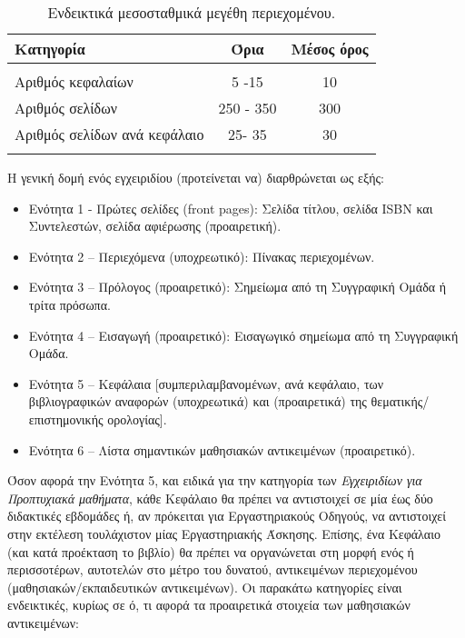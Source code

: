 \begin{table} [h] \centering
\caption{Ενδεικτικά μεσοσταθμικά μεγέθη περιεχομένου.}
\vspace{2mm}
\begin{tabular} {l c c}
\hline
	\textbf{Κατηγορία}	&\textbf{Όρια}	&\textbf{Μέσος όρος}\\
\hline
		&	    &	\\
Αριθμός κεφαλαίων	&5 -15 	&10\\
Αριθμός σελίδων	&250 - 350	    &300	\\
Αριθμός σελίδων ανά κεφάλαιο	&25- 35	    &30	\\
	&	    &	\\
\hline
\end{tabular}
\label{table:megethi}
\end{table}

Η γενική δομή ενός εγχειριδίου (προτείνεται να) διαρθρώνεται ως εξής:
\begin{itemize}
\item Ενότητα  1  - Πρώτες  σελίδες  (front pages): Σελίδα  τίτλου,  σελίδα  ISBN  και
Συντελεστών, σελίδα αφιέρωσης (προαιρετική).
\item Ενότητα 2 – Περιεχόμενα (υποχρεωτικό): Πίνακας περιεχομένων.
\item  Ενότητα 3 – Πρόλογος (προαιρετικό): Σημείωμα από τη Συγγραφική Ομάδα ή τρίτα
πρόσωπα.
\item Ενότητα 4 –  Εισαγωγή (προαιρετικό):  Εισαγωγικό σημείωμα από τη Συγγραφική
Ομάδα.
\item  Ενότητα 5 – Κεφάλαια [συμπεριλαμβανομένων, ανά κεφάλαιο, των βιβλιογραφικών
αναφορών (υπο\-χρε\-ω\-τι\-κά) και (προαιρετικά) της θεματικής/επιστημονικής ορολογίας].
\item  Ενότητα 6 – Λίστα σημαντικών μαθησιακών αντικειμένων (προαιρετικό).
\end{itemize}

Όσον αφορά την Ενότητα 5, και ειδικά για την κατηγορία των \emph{Εγχειριδίων για Προπτυχιακά
μαθήματα}, κάθε Κεφάλαιο θα πρέπει να αντιστοιχεί σε μία έως δύο διδακτικές εβδομάδες
ή, αν πρόκειται για Εργαστηριακούς Οδηγούς, να αντιστοιχεί στην εκτέλεση τουλάχιστον
μίας Εργαστηριακής Άσκησης. Επίσης, ένα Κεφάλαιο (και κατά προέκταση το βιβλίο) θα
πρέπει  να  οργανώνεται  στη  μορφή  ενός  ή  περισσοτέρων,  αυτοτελών  στο  μέτρο  του
δυνατού, αντικειμένων  περιεχομένου  (μαθησιακών/εκπαιδευτικών  αντικειμένων).  Οι
παρακάτω κατηγορίες είναι ενδεικτικές, κυρίως σε ό, τι αφορά τα προαιρετικά στοιχεία των
μαθησιακών αντικειμένων:

